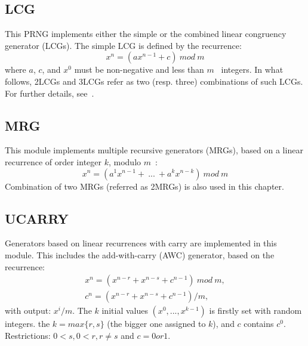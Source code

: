 \subsection{LCG}
This PRNG implements either the simple or the combined linear congruency generator (LCGs). The simple LCG is defined by the recurrence:
\begin{equation}
x^n = (ax^{n-1} + c)~mod~m
\label{LCG}
\end{equation}
where $a$, $c$, and $x^0$ must be non-negative and less than $m$~\cite{Lecuyer2009} integers. In what follows, 2LCGs and 3LCGs refer as two (resp. three) combinations of such LCGs.
For further details, see~\cite{combined_lcg}.

\subsection{MRG}
This module implements multiple recursive generators (MRGs), based on a linear recurrence of order integer $k$, modulo $m$~\cite{Lecuyer2009}:
\begin{equation}
x^n = (a^1x^{n-1}+~...~+a^kx^{n-k})~mod~m
\label{MRG}
\end{equation}
Combination of two MRGs (referred as 2MRGs) is also used in this chapter.

\subsection{UCARRY}
Generators based on linear recurrences with carry are implemented in this module. This includes the add-with-carry (AWC) generator, based on the recurrence:
\begin{equation}
\label{AWC}
\begin{array}{l}
x^n = (x^{n-r} + x^{n-s} + c^{n-1})~mod~m, \\
c^n= (x^{n-r} + x^{n-s} + c^{n-1}) / m, \end{array}\end{equation}
with output: $x^i/m$. The $k$ initial values $(x^0,... ,x^{k-1})$ is firstly set with random integers.
the $k = max\{r, s\}$ (the bigger one assigned to $k$), and $c$ contains $c^0$. Restrictions: $0 < s, 0 < r, r\neq s$ and $c = 0 or 1$.

